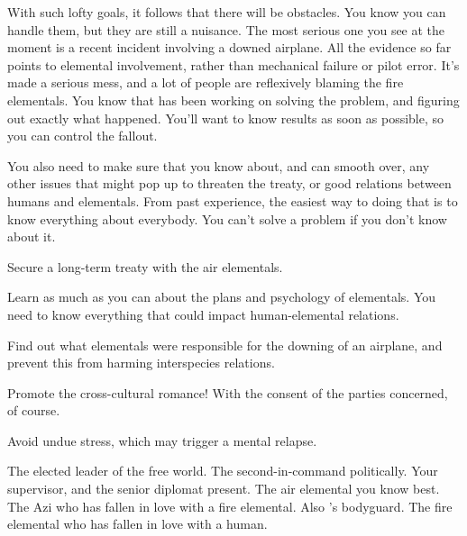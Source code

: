\documentclass[char]{elementals}
\begin{document}
With such lofty goals, it follows that there will be obstacles.  You know you can handle them, but they are still a nuisance.  The most serious one you see at the moment is a recent incident involving a downed airplane.  All the evidence so far points to elemental involvement, rather than mechanical failure or pilot error.  It's made a serious mess, and a lot of people are reflexively blaming the fire elementals.  You know that \cScientist{} has been working on solving the problem, and figuring out exactly what happened.  You'll want to know \cScientist{\their} results as soon as possible, so you can control the fallout.

You also need to make sure that you know about, and can smooth over, any other issues that might pop up to threaten the treaty, or good relations between humans and elementals.  From past experience, the easiest way to doing that is to know everything about everybody.  You can't solve a problem if you don't know about it.

\begin{itemz}[Goals]
	\item  Secure a long-term treaty with the air elementals.
	\item  Learn as much as you can about the plans and psychology of elementals.  You need to know everything that could impact human-elemental relations.
	\item  Find out what elementals were responsible for the downing of an airplane, and prevent this from harming interspecies relations.
	\item  Promote the cross-cultural romance!  With the consent of the parties concerned, of course.
	\item  Avoid undue stress, which may trigger a mental relapse.
\end{itemz}

\begin{contacts}
	\contact{\cLeader{}}  The elected leader of the free world.
	\contact{\cDema{}}  The second-in-command politically.
	\contact{\cAvatar{}}  Your supervisor, and the senior diplomat present.
	\contact{\cNaturalist{}}  The air elemental you know best. 
	\contact{\cRomeo{}}  The Azi who has fallen in love with a fire elemental.  Also \cLeader{}'s bodyguard.
	\contact{\cJuliet{}}  The fire elemental who has fallen in love with a human.
\end{contacts}
\end{document}

